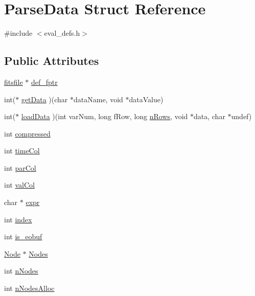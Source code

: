 \hypertarget{struct_parse_data}{}\section{Parse\+Data Struct Reference}
\label{struct_parse_data}


{\ttfamily \#include $<$eval\+\_\+defs.\+h$>$}

\subsection*{Public Attributes}
\begin{DoxyCompactItemize}
\item 
\hyperlink{structfitsfile}{fitsfile} $\ast$ \hyperlink{struct_parse_data_a048ddfac08cac2e108b4ffa5251adc05}{def\+\_\+fptr}
\item 
int($\ast$ \hyperlink{struct_parse_data_a90eeba5b9a1963ad3e8ca4fde995b4d5}{get\+Data} )(char $\ast$data\+Name, void $\ast$data\+Value)
\item 
int($\ast$ \hyperlink{struct_parse_data_a2a675163f5363ca4fcee687a52fe655e}{load\+Data} )(int var\+Num, long f\+Row, long \hyperlink{struct_parse_data_ab3c5bfc5827fa18b813cc25ade560dfa}{n\+Rows}, void $\ast$data, char $\ast$undef)
\item 
int \hyperlink{struct_parse_data_a33dc296a783fc4c3f17df73305945712}{compressed}
\item 
int \hyperlink{struct_parse_data_af6201fbd1560e2978526904f79540e75}{time\+Col}
\item 
int \hyperlink{struct_parse_data_ab292a0178648071b74b9473618a683a4}{par\+Col}
\item 
int \hyperlink{struct_parse_data_a89d994138494a49fafbd10338c670301}{val\+Col}
\item 
char $\ast$ \hyperlink{struct_parse_data_a83ea2e0151f87c9f5e7fe4572f2a0127}{expr}
\item 
int \hyperlink{struct_parse_data_a1e5d7545a2b38a513e8a572f25410daa}{index}
\item 
int \hyperlink{struct_parse_data_adc63cd751218ad5abfd8ba3d28d91d4a}{is\+\_\+eobuf}
\item 
\hyperlink{struct_node}{Node} $\ast$ \hyperlink{struct_parse_data_a4106ba5eda84779411fd9cf84038cfa5}{Nodes}
\item 
int \hyperlink{struct_parse_data_acb16ab0b4078cf54f5637ca50c4c51ad}{n\+Nodes}
\item 
int \hyperlink{struct_parse_data_a0636743f130eb7577815ef3820bf04a2}{n\+Nodes\+Alloc}

\end{DoxyCompactItemize}
